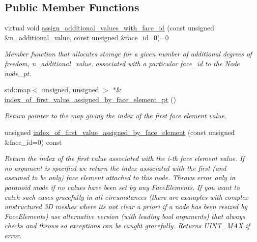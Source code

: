 \subsection*{Public Member Functions}
\begin{DoxyCompactItemize}
\item 
virtual void \hyperlink{classoomph_1_1BoundaryNodeBase_a2af96b956e59182fe8bfe8e2a87e02ce}{assign\+\_\+additional\+\_\+values\+\_\+with\+\_\+face\+\_\+id} (const unsigned \&n\+\_\+additional\+\_\+value, const unsigned \&face\+\_\+id=0)=0
\begin{DoxyCompactList}\small\item\em Member function that allocates storage for a given number of additional degrees of freedom, n\+\_\+additional\+\_\+value, associated with a particular face\+\_\+id to the \hyperlink{classoomph_1_1Node}{Node} node\+\_\+pt. \end{DoxyCompactList}\item 
std\+::map$<$ unsigned, unsigned $>$ $\ast$\& \hyperlink{classoomph_1_1BoundaryNodeBase_a2f5dc814c83956b5af7342bbfcca0ef0}{index\+\_\+of\+\_\+first\+\_\+value\+\_\+assigned\+\_\+by\+\_\+face\+\_\+element\+\_\+pt} ()
\begin{DoxyCompactList}\small\item\em Return pointer to the map giving the index of the first face element value. \end{DoxyCompactList}\item 
unsigned \hyperlink{classoomph_1_1BoundaryNodeBase_a67c470bd15750e91775101b5bce65a58}{index\+\_\+of\+\_\+first\+\_\+value\+\_\+assigned\+\_\+by\+\_\+face\+\_\+element} (const unsigned \&face\+\_\+id=0) const
\begin{DoxyCompactList}\small\item\em Return the index of the first value associated with the i-\/th face element value. If no argument is specified we return the index associated with the first (and assumed to be only) face element attached to this node. Throws error only in paranoid mode if no values have been set by any Face\+Elements. If you want to catch such cases gracefully in all circumstances (there are examples with complex unstructured 3D meshes where it\textquotesingle{}s not clear a priori if a node has been resized by Face\+Elements) use alternative version (with leading bool arguments) that always checks and throws so exceptions can be caught gracefully. Returns U\+I\+N\+T\+\_\+\+M\+AX if error. \end{DoxyCompactList}\item 

\end{DoxyCompactItemize}

